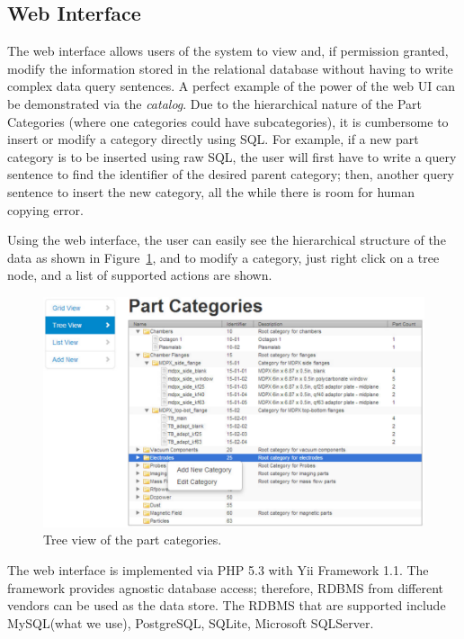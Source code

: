 
\subsection{Web Interface}

The web interface allows users of the system to view and, if permission granted, modify the information stored in the relational database without having to write complex data query sentences. A perfect example of the power of the web UI can be demonstrated via the \emph{catalog}. Due to the hierarchical nature of the Part Categories (where one categories could have subcategories), it is cumbersome to insert or modify a category directly using SQL. For example, if a new part category is to be inserted using raw SQL, the user will first have to write a query sentence to find the identifier of the desired parent category; then, another query sentence to insert the new category, all the while there is room for human copying error.

Using the web interface, the user can easily see the hierarchical structure of the data as shown in Figure~\ref{fig:partcat}, and to modify a category, just right click on a tree node, and a list of supported actions are shown.

\begin{figure}[h]
\centering
\includegraphics[width=6in]{partcat.pdf}
\caption{Tree view of the part categories.\label{fig:partcat}}
\end{figure}

The web interface is implemented via PHP 5.3 with Yii Framework 1.1. The framework provides agnostic database access; therefore, RDBMS from different vendors can be used as the data store. The RDBMS that are supported include MySQL(what we use), PostgreSQL, SQLite, Microsoft SQLServer.

